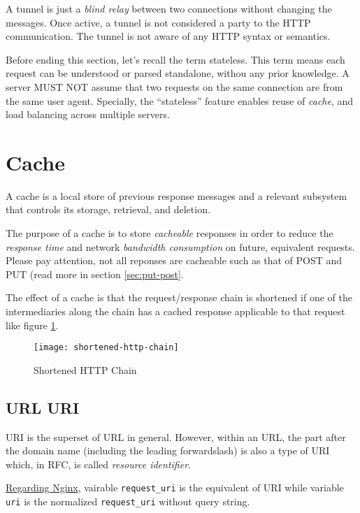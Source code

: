 A tunnel is just a \textit{blind relay} between two connections
without changing the messages. Once active, a tunnel is not
considered a party to the HTTP communication. The tunnel is not
aware of any HTTP syntax or semantics.

Before ending this section, let's recall the term stateless. This
term means each request can be understood or parsed standalone,
withou any prior knowledge. A server MUST NOT assume that two
requests on the same connection are from the same user
agent. Specially, the ``stateless'' feature enables reuse of
\textit{cache}, and load balancing across multiple servers.

\section{Cache}
\label{sec:http-cache}

A cache is a local store of previous response messages and
a relevant subsystem that controls its storage, retrieval, and
deletion.

The purpose of a cache is to store \textit{cacheable} responses in
order to reduce the \textit{response time} and network
\textit{bandwidth consumption} on future, equivalent
requests. Please pay attention, not all reponses are cacheable
such as that of POST and PUT (read more in section
\ref{sec:put-post}.

The effect of a cache is that the request/response chain is
shortened if one of the intermediaries along the chain has a
cached response applicable to that request like figure
\ref{fig:shortened-http-chain}.

\begin{figure}[bp]
  \centering
  \texttt{[image: shortened-http-chain]}
  \caption{Shortened HTTP Chain}
  \label{fig:shortened-http-chain}
\end{figure}

\subsection{URL URI}
\label{sec:url-uri}

URI is the superset of URL in general. However, within an URL, the
part after the domain name (including the leading forwardslash) is
also a type of URI which, in RFC, is called \textit{resource
  identifier}.

\href{https://stackoverflow.com/q/28592077}{Regarding Nginx},
vairable \verb|request_uri| is the equivalent of URI while
variable \verb|uri| is the normalized \verb|request_uri| without
query string.

